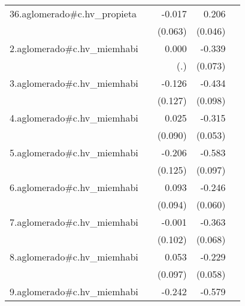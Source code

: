 {\begin{longtable}{l*{4}{D{.}{.}{-1}}}
\addlinespace
36.aglomerado#c.hv\_propieta&                     &      -0.017         &       0.206\sym{***}&                     \\
            &                     &     (0.063)         &     (0.046)         &                     \\
\addlinespace
2.aglomerado#c.hv\_miemhabi&                     &       0.000         &      -0.339\sym{***}&                     \\
            &                     &         (.)         &     (0.073)         &                     \\
\addlinespace
3.aglomerado#c.hv\_miemhabi&                     &      -0.126         &      -0.434\sym{***}&                     \\
            &                     &     (0.127)         &     (0.098)         &                     \\
\addlinespace
4.aglomerado#c.hv\_miemhabi&                     &       0.025         &      -0.315\sym{***}&                     \\
            &                     &     (0.090)         &     (0.053)         &                     \\
\addlinespace
5.aglomerado#c.hv\_miemhabi&                     &      -0.206         &      -0.583\sym{***}&                     \\
            &                     &     (0.125)         &     (0.097)         &                     \\
\addlinespace
6.aglomerado#c.hv\_miemhabi&                     &       0.093         &      -0.246\sym{***}&                     \\
            &                     &     (0.094)         &     (0.060)         &                     \\
\addlinespace
7.aglomerado#c.hv\_miemhabi&                     &      -0.001         &      -0.363\sym{***}&                     \\
            &                     &     (0.102)         &     (0.068)         &                     \\
\addlinespace
8.aglomerado#c.hv\_miemhabi&                     &       0.053         &      -0.229\sym{***}&                     \\
            &                     &     (0.097)         &     (0.058)         &                     \\
\addlinespace
9.aglomerado#c.hv\_miemhabi&                     &      -0.242\sym{*}  &      -0.579\sym{***}&                     \\

\end{longtable}}

